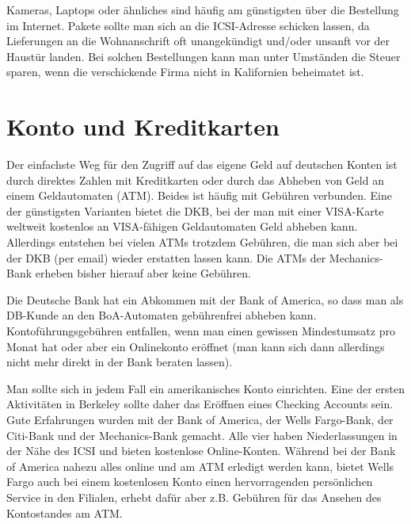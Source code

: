 \documentclass[a4paper]{scrreprt}
\begin{document}
Kameras, Laptops oder ähnliches sind häufig am günstigsten über die
Bestellung im Internet. Pakete sollte man sich an die ICSI-Adresse
schicken lassen, da Lieferungen an die Wohnanschrift oft unangekündigt
und/oder unsanft vor der Haustür landen. Bei solchen Bestellungen kann
man unter Umständen die Steuer sparen, wenn die verschickende Firma
nicht in Kalifornien beheimatet ist.


\section{Konto und Kreditkarten}

Der einfachste Weg für den Zugriff auf das eigene Geld auf deutschen Konten ist durch direktes Zahlen mit Kreditkarten oder durch das Abheben von Geld an einem Geldautomaten (ATM). Beides ist häufig mit Gebühren verbunden. Eine der günstigsten Varianten bietet die DKB, bei der man mit einer VISA-Karte weltweit kostenlos an VISA-fähigen Geldautomaten Geld abheben kann. Allerdings entstehen bei vielen ATMs trotzdem Gebühren, die man sich aber bei der DKB (per email) wieder erstatten lassen kann. Die ATMs der Mechanics-Bank erheben bisher hierauf aber keine Gebühren.

Die Deutsche Bank hat ein Abkommen mit der Bank of America, so dass man als DB-Kunde an den BoA-Automaten gebührenfrei abheben kann. Kontoführungsgebühren entfallen, wenn man einen gewissen Mindestumsatz pro Monat hat oder aber ein Onlinekonto eröffnet (man kann sich dann allerdings nicht mehr direkt in der Bank beraten lassen).

Man sollte sich in jedem Fall ein amerikanisches Konto einrichten. Eine der ersten Aktivitäten in Berkeley sollte daher das Eröffnen eines Checking Accounts sein. Gute Erfahrungen wurden mit der Bank of America, der Wells Fargo-Bank, der Citi-Bank und der Mechanics-Bank gemacht. Alle vier haben Niederlassungen in der Nähe des ICSI und bieten kostenlose Online-Konten. Während bei der Bank of America nahezu alles online und am ATM erledigt werden kann, bietet Wells Fargo auch bei einem kostenlosen Konto einen hervorragenden persönlichen Service in den Filialen, erhebt dafür aber z.B. Gebühren für das Ansehen des Kontostandes am ATM.
\end{document}
